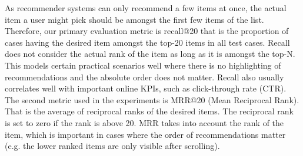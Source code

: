 As recommender systems can only recommend a few items at once, the actual item a user might pick should be amongst the first few items of the list. Therefore, our primary evaluation metric is recall@20 that is the proportion of cases having the desired item amongst the top-20 items in all test cases. Recall does not consider the actual rank of the item as long as it is amongst the top-N. This models certain practical scenarios well where there is no highlighting of recommendations and the absolute order does not matter. Recall also usually correlates well with important online KPIs, such as click-through rate (CTR)\citep{Liu:2012EBR,itals_ecml}. The second metric used in the experiments is MRR@20 (Mean Reciprocal Rank). That is the average of reciprocal ranks of the desired items. The reciprocal rank is set to zero if the rank is above 20. MRR takes into account the rank of the item, which is important in cases where the order of recommendations matter (e.g. the lower ranked items are only visible after scrolling).

